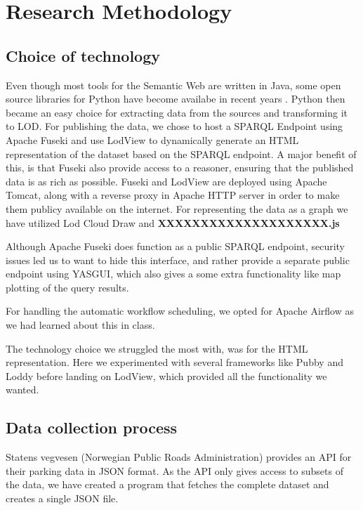 \chapter{Research Methodology}

\section{Choice of technology}
Even though most tools for the Semantic Web are written in Java, some open source libraries for Python have become availabe in recent years \cite{w3java}. Python then became an easy choice for extracting data from the sources and transforming it to LOD. For publishing the data, we chose to host a SPARQL Endpoint using Apache Fuseki and use LodView to dynamically generate an HTML representation of the dataset based on the SPARQL endpoint. A major benefit of this, is that Fuseki also provide access to a reasoner, ensuring that the published data is as rich as possible. Fuseki and LodView are deployed using Apache Tomcat, along with a reverse proxy in Apache HTTP server in order to make them publicy available on the internet. For representing the data as a graph we have utilized Lod Cloud Draw and \textbf{XXXXXXXXXXXXXXXXXXXX.js}

\vspace{5mm}

Although Apache Fuseki does function as a public SPARQL endpoint, security issues led us to want to hide this interface, and rather provide a separate public endpoint using YASGUI, which also gives a some extra functionality like map plotting of the query results.

\vspace{5mm}

For handling the automatic workflow scheduling, we opted for Apache Airflow as we had learned about this in class.

\vspace{5mm}

The technology choice we struggled the most with, was for the HTML representation. Here we experimented with several frameworks like Pubby and Loddy before landing on LodView, which provided all the functionality we wanted.

\section{Data collection process}
Statens vegvesen (Norwegian Public Roads Administration) \cite{statensvegvesen} provides an API for their parking data in JSON format. As the API only gives access to subsets of the data, we have created a program that fetches the complete dataset and creates a single JSON file.

